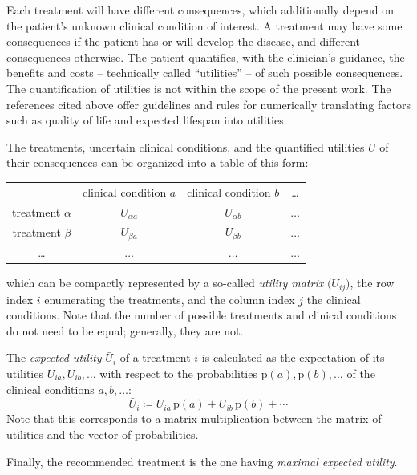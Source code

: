 \documentclass[a4paper,12pt,%
onecolumn,oneside,article,%
british%
]{memoir}
\theoremstyle{remark}
\theoremstyle{innote}
\newcommand*{\pencil}{{\fontencoding{U}\fontfamily{fontawesometwo}\selectfont\symbol{210}}}
\newcommand{\mynotep}[1]{{\footnotesize\color{notecolour}\pencil\ #1}}
\newcommand*{\defd}{\coloneqq}
\newcommand*{\p}{\mathrm{p}}%
\renewcommand*{\|}[1][]{\nonscript\:#1\vert\nonscript\:\mathopen{}}
\newcommand*{\eU}{\bar{U}}
\begin{document}
Each treatment will have different consequences, which additionally depend on the patient's unknown clinical condition of interest. A treatment may have some consequences if the patient has or will develop the disease, and different consequences otherwise. The patient quantifies, with the clinician's guidance, the benefits and costs -- technically called \enquote{utilities} -- of such possible consequences. The quantification of utilities is not within the scope of the present work. The references cited above offer guidelines and rules for numerically translating factors such as quality of life and expected lifespan into utilities.

The treatments, uncertain clinical conditions, and the quantified utilities $U$ of their consequences can be organized into a table of this form:
  \begin{center}
    \begin{tabular}{cccc}
      &{\small clinical condition $a$}&{\small clinical condition $b$}&{\small \ldots}
      \\[2\jot]
      {\small treatment $\alpha$} & $U_{\alpha a}$ & $U_{\alpha b}$ &$\dotso$ \\[\jot]
      {\small treatment $\beta$} & $U_{\beta a}$ & $U_{\beta b}$ &$\dotso$ \\[\jot]
      {\small \ldots} &$\dotso$&$\dotso$&$\dotso$
    \end{tabular}
  \end{center}
which can be compactly represented by a so-called \emph{utility matrix} $\bigl(U_{ij})$, the row index $i$ enumerating the treatments, and the column index $j$ the clinical conditions. Note that the number of possible treatments and clinical conditions do not need to be equal; generally, they are not.

The \emph{expected utility} $\eU_{i}$ of a treatment $i$ is calculated as the expectation of its utilities $U_{ia}, U_{ib}, \dotsc$ with respect to the probabilities $\p(a), \p(b), \dotsc$ of the clinical conditions $a,b,\dotsc$:
\begin{equation}
  \label{eq:def_expected_utility}
  \eU_{i} \defd U_{ia}\, \p(a) + U_{ib}\, \p(b) + \dotsb
\end{equation}
Note that this corresponds to a matrix multiplication between the matrix of utilities and the vector of probabilities.

Finally, the recommended treatment is the one having \emph{maximal expected utility}.

\end{document}
